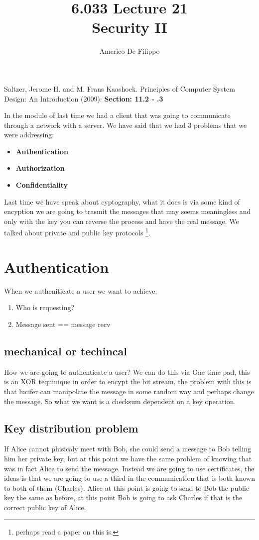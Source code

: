 \documentclass{article}
\title{6.033 Lecture 21 \\ Security II}
\author{Americo De Filippo}
\begin{document}
 
  \maketitle
    \begin{thebibliography}{9}
      Saltzer, Jerome H. and M. Frans Kaashoek. Principles of Computer System Design: An Introduction (2009): \textbf{Section: 11.2 - .3} 
    \end{thebibliography}
    \maketitle
    In the module of last time we had a client that was going to communicate through a network
    with a server. We have said that we had 3 problems that we were addressing:
    \begin{itemize}
      \item\textbf{Authentication}
      \item\textbf{Authorization}
      \item\textbf{Confidentiality}
    \end{itemize}
    Last time we have speak about cyptography, what it does is via some kind of encyption
    we are going to trasmit the messages that may seems meaningless and only with the key you 
    can reverse the process and have the real message. We talked about private and public key 
    protocols \footnote{perhaps read a paper on this is.}.
    \section{Authentication}
      When we autheniticate a user we want to achieve:
      \begin{enumerate}
        \item Who is requesting?
        \item Message sent == message recv 
      \end{enumerate}
      \subsection{mechanical or techincal}
        How we are going to authenticate a user? We can do this via One time pad, this is an
        XOR tequinique in order to encypt the bit stream, the problem with this is that lucifer
        can manipolate the message in some random way and perhaps change the message. So what
        we want is a checksum dependent on a key operation.
      \subsection{Key distribution problem}
        If Alice cannot phisicaly meet with Bob, she could send a message to Bob telling him 
        her private key, but at this point we have the same problem of knowing that was in 
        fact Alice to send the message. Instead we are going to use certificates, the ideas
        is that we are going to use a third in the communication that is both known to both 
        of them (Charles). Alice at this point is going to send to Bob the public key the same
        as before, at this point Bob is going to ask Charles if that is the correct public key 
      of Alice.
\end{document}
